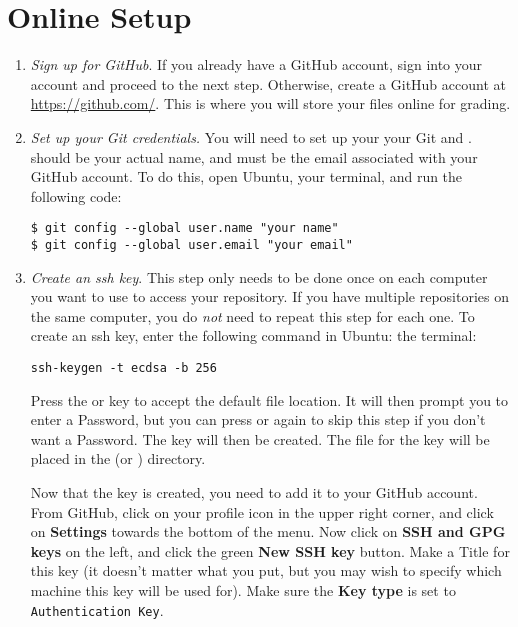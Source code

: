 \section*{Online Setup}
\begin{enumerate}
    \item \emph{Sign up for GitHub}.
    \label{step:sign-up}
    If you already have a GitHub account, sign into your account and proceed to the next step.
    Otherwise, create a GitHub account at \url{https://github.com/}.
    This is where you will store your files online for grading.
  
    \item \emph{Set up your Git credentials.}
    You will need to set up your your Git  and .
     should be your actual name, and  must be the email associated with your GitHub account.
    To do this, open 
    \ifwindows
    Ubuntu,
    \else 
    your terminal,
    \fi
    and run the following code:
\begin{lstlisting}
$ git config --global user.name "your name"
$ git config --global user.email "your email"
\end{lstlisting}    

    \item \emph{Create an ssh key}.
    This step only needs to be done once on each computer you want to use to access your repository.
    If you have multiple repositories on the same computer, you do \emph{not} need to repeat this step for each one.
    To create an ssh key, enter the following command in
    \ifwindows
    Ubuntu:
    \else
    the terminal:
    \fi
\begin{lstlisting}
ssh-keygen -t ecdsa -b 256
\end{lstlisting}
    Press the  or  key to accept the default file location.
    It will then prompt you to enter a Password, but you can press  or  again to skip this step if you don't want a Password.
    The key will then be created.
    The file for the key will be placed in the  (or ) directory.
  
    Now that the key is created, you need to add it to your GitHub account.
    From GitHub, click on your profile icon in the upper right corner, and click on \textbf{Settings} towards the bottom of the menu.
    Now click on \textbf{SSH and GPG keys} on the left, and click the green \textbf{New SSH key} button.
    Make a Title for this key (it doesn't matter what you put, but you may wish to specify which machine this key will be used for).
    Make sure the \textbf{Key type} is set to \texttt{Authentication Key}.


\end{enumerate}

